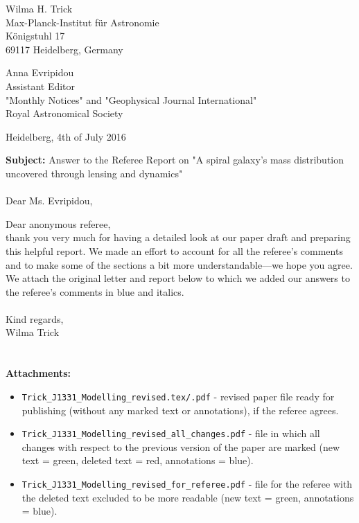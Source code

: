 \documentclass[10pt,a4paper]{article}
\begin{document}
\begin{flushright}
Wilma H. Trick\\
Max-Planck-Institut f\"{u}r Astronomie\\
K\"{o}nigstuhl 17\\
69117 Heidelberg, Germany
\end{flushright}

\noindent Anna Evripidou\\
Assistant Editor\\
"Monthly Notices" and "Geophysical Journal International"\\
Royal Astronomical Society\\

\begin{flushright}
Heidelberg, 4th of July 2016
\end{flushright}

\textbf{Subject:} Answer to the Referee Report on "A spiral galaxy's mass distribution uncovered through lensing and dynamics"\\\\

Dear Ms. Evripidou,

Dear anonymous referee,\\

thank you very much for having a detailed look at our paper draft and preparing this helpful report. We made an effort to account for all the referee's comments and to make some of the sections a bit more understandable---we hope you agree. We attach the original letter and report below to which we added our answers to the referee's comments in blue and italics. \\\\
Kind regards,\\
Wilma Trick\\\\\\

\noindent\textbf{Attachments:}
\begin{itemize}
\item \texttt{Trick{\_}J1331{\_}Modelling{\_}revised.tex/.pdf} - revised paper file ready for publishing (without any marked text or annotations), if the referee agrees.
\item \texttt{Trick{\_}J1331{\_}Modelling{\_}revised{\_}all{\_}changes.pdf} - file in which all changes with respect to the previous version of the paper are marked (new text = green, deleted text = red, annotations = blue).
\item \texttt{Trick{\_}J1331{\_}Modelling{\_}revised{\_}for{\_}referee.pdf} - file for the referee with the deleted text excluded to be more readable (new text = green, annotations = blue).
\end{itemize}
\end{document}
